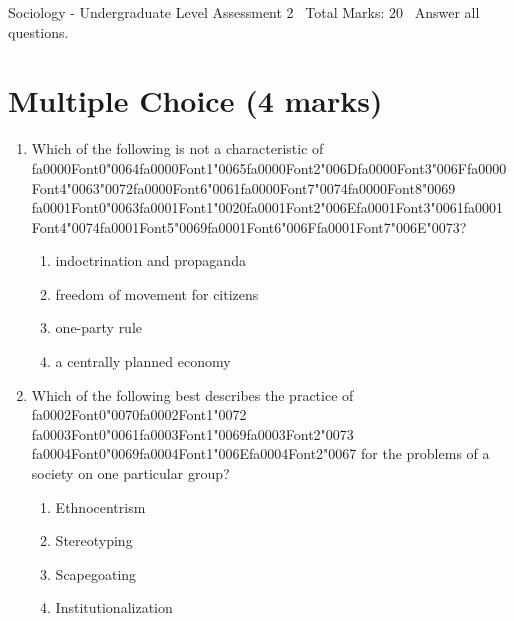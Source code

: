 \documentclass[12pt]{article}
\begin{document}
\begin{center}
Sociology - Undergraduate Level Assessment 2 \
Total Marks: 20 \
Answer all questions.
\end{center}

\section*{Multiple Choice (4 marks)}
\begin{enumerate}[label=\arabic*.]
\item Which of the following is not a characteristic of {\csname fa0000Font0\endcsname\char"0064}{\csname fa0000Font1\endcsname\char"0065}{\csname fa0000Font2\endcsname\char"006D}{\csname fa0000Font3\endcsname\char"006F}{\csname fa0000Font4\endcsname\char"0063}{\char"0072}{\csname fa0000Font6\endcsname\char"0061}{\csname fa0000Font7\endcsname\char"0074}{\csname fa0000Font8\endcsname\char"0069} {\csname fa0001Font0\endcsname\char"0063}{\csname fa0001Font1\endcsname\char"0020}{\csname fa0001Font2\endcsname\char"006E}{\csname fa0001Font3\endcsname\char"0061}{\csname fa0001Font4\endcsname\char"0074}{\csname fa0001Font5\endcsname\char"0069}{\csname fa0001Font6\endcsname\char"006F}{\csname fa0001Font7\endcsname\char"006E}{\char"0073}?
\begin{enumerate}[label=(\alph*)]
    \item indoctrination and propaganda
    \item freedom of movement for citizens
    \item one-party rule
    \item a centrally planned economy
\end{enumerate}
\item Which of the following best describes the practice of {\csname fa0002Font0\endcsname\char"0070}{\csname fa0002Font1\endcsname\char"0072} {\csname fa0003Font0\endcsname\char"0061}{\csname fa0003Font1\endcsname\char"0069}{\csname fa0003Font2\endcsname\char"0073} {\csname fa0004Font0\endcsname\char"0069}{\csname fa0004Font1\endcsname\char"006E}{\csname fa0004Font2\endcsname\char"0067} for the problems of a society on one particular group?
\begin{enumerate}[label=(\alph*)]
    \item Ethnocentrism
    \item Stereotyping
    \item Scapegoating
    \item Institutionalization
\end{enumerate}
\end{enumerate}
\end{document}
